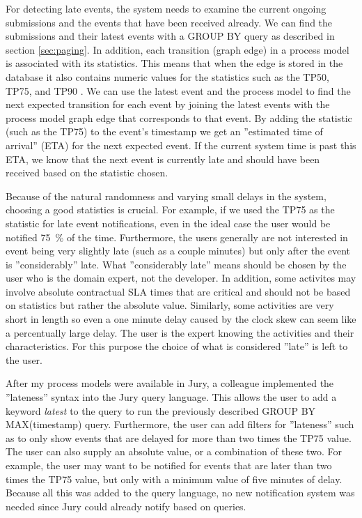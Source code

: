 For detecting late events, the system needs to examine the current ongoing submissions and the events that have been received already.
We can find the submissions and their latest events with a GROUP BY query as described in section \ref{sec:paging}.
In addition, each transition (graph edge) in a process model is associated with its statistics. 
This means that when the edge is stored in the database it also contains numeric values for the statistics such as the TP50, TP75, and TP90 .
We can use the latest event and the process model to find the next expected transition for each event by joining the latest events with the process model graph edge that corresponds to that event.
By adding the statistic (such as the TP75) to the event's timestamp we get an ''estimated time of arrival'' (ETA) for the next expected event.
If the current system time is past this ETA, we know that the next event is currently late and should have been received based on the statistic chosen.

Because of the natural randomness and varying small delays in the system, choosing a good statistics is crucial. 
For example, if we used the TP75 as the statistic for late event notifications, even in the ideal case the user would be notified 75~\% of the time.
Furthermore, the users generally are not interested in event being very slightly late (such as a couple minutes) but only after the event is ''considerably'' late.
What ''considerably late'' means should be chosen by the user who is the domain expert, not the developer.
In addition, some activites may involve absolute contractual SLA times that are critical and should not be based on statistics but rather the absolute value.
Similarly, some activities are very short in length so even a one minute delay caused by the clock skew can seem like a percentually large delay.
The user is the expert knowing the activities and their characteristics.
For this purpose the choice of what is considered ''late'' is left to the user.

After my process models were available in Jury, a colleague implemented the ''lateness'' syntax into the Jury query language. 
This allows the user to add a keyword \emph{latest} to the query to run the previously described GROUP BY MAX(timestamp) query.
Furthermore, the user can add filters for ''lateness'' such as to only show events that are delayed for more than two times the TP75 value.
The user can also supply an absolute value, or a combination of these two.
For example, the user may want to be notified for events that are later than two times the TP75 value, but only with a minimum value of five minutes of delay.
Because all this was added to the query language, no new notification system was needed since Jury could already notify based on queries.

